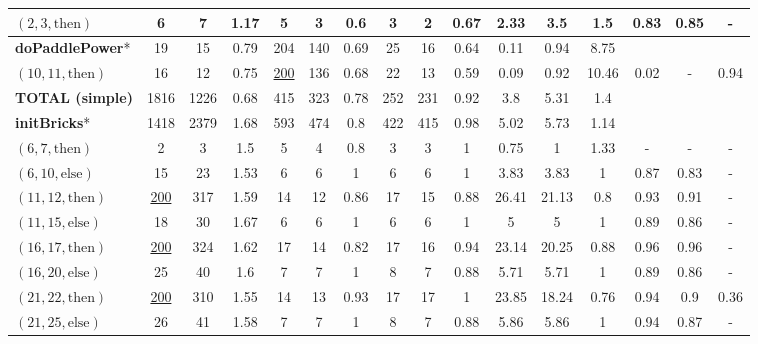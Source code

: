 \documentclass[sigconf,review]{acmart}
\newcommand{\thenBr}{\text{then}}
\newcommand{\elseBr}{\text{else}}
\newcommand{\un}[1]{\underline{#1}}
\begin{document}
\begin{table}[!t]
\begin{tabular}{l|ccc|ccc|ccc|ccc|ccc}
    $(2,3,\thenBr)$          & 6        & 7    & 1.17      & 5  & 3 & 0.6               & 3  & 2  & 0.67               & 2.33   & 3.5  & 1.5    & 0.83 & 0.85 & -  \\
    \hline
   \textbf{doPaddlePower}*   & 19       & 15   & 0.79      & 204  & 140 & 0.69          & 25 & 16  & 0.64              & 0.11   & 0.94 & 8.75   &       &      &      \\
    $(10,11,\thenBr)$        & 16       & 12   & 0.75      & \un{200} & 136 & 0.68      & 22 & 13  & 0.59              & 0.09   & 0.92 & 10.46  &  0.02 & - & 0.94 \\
   \midrule
    \textbf{TOTAL (simple)}          & 1816      & 1226 & 0.68      & 415 & 323 & 0.78          & 252 & 231 & 0.92              & 3.8    & 5.31  & 1.4       &   &   &    \\  
    \bottomrule
   \textbf{initBricks}*      & 1418     & 2379 & 1.68      & 593  & 474 & 0.8           & 422 & 415 & 0.98             & 5.02   & 5.73  & 1.14   &      &      &       \\
    $(6,7,\thenBr)$          & 2        & 3    & 1.5       & 5    & 4   & 0.8           & 3   & 3   & 1                & 0.75   & 1     & 1.33   & - & -  & -   \\
    $(6,10,\elseBr)$         & 15       & 23   & 1.53      & 6    & 6   & 1             & 6   & 6   & 1                & 3.83   & 3.83  & 1      & 0.87 & 0.83 & -   \\
    $(11,12,\thenBr)$        & \un{200} & 317  & 1.59      & 14   & 12  & 0.86          & 17  & 15  & 0.88             & 26.41  & 21.13 & 0.8    & 0.93 & 0.91 & -  \\
    $(11,15,\elseBr)$        & 18       & 30   & 1.67      & 6    & 6   & 1             & 6   & 6   & 1                & 5      & 5     & 1      & 0.89 & 0.86 & -  \\
    $(16,17,\thenBr)$        & \un{200} & 324  & 1.62      & 17   & 14  & 0.82          & 17  & 16  & 0.94             & 23.14  & 20.25 & 0.88   & 0.96 & 0.96 & -  \\
    $(16,20,\elseBr)$        & 25       & 40   & 1.6       & 7    & 7   & 1             & 8   & 7   & 0.88             & 5.71   & 5.71  & 1      & 0.89 & 0.86 & -  \\
    $(21,22,\thenBr)$        & \un{200} & 310  & 1.55      & 14   & 13  & 0.93          & 17  & 17  & 1                & 23.85  & 18.24 & 0.76   & 0.94 & 0.9  & 0.36  \\
    $(21,25,\elseBr)$        & 26       & 41   & 1.58      & 7    & 7   & 1             & 8   & 7   & 0.88             & 5.86   & 5.86  & 1      & 0.94 & 0.87 & -  \\

\end{tabular}
\end{table}
\end{document}

